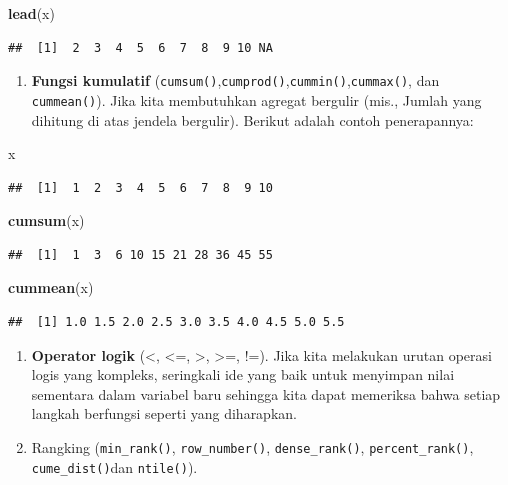 \documentclass[]{book}
\newenvironment{Shaded}{\begin{snugshade}}{\end{snugshade}}
\newcommand{\KeywordTok}[1]{\textcolor[rgb]{0.13,0.29,0.53}{\textbf{#1}}}
\newcommand{\NormalTok}[1]{#1}
\providecommand{\tightlist}{%
  \setlength{\itemsep}{0pt}\setlength{\parskip}{0pt}}
\begin{document}
\begin{Shaded}
\begin{Highlighting}[]
\KeywordTok{lead}\NormalTok{(x)}
\end{Highlighting}
\end{Shaded}

\begin{verbatim}
##  [1]  2  3  4  5  6  7  8  9 10 NA
\end{verbatim}

\begin{enumerate}
\def\labelenumi{\arabic{enumi}.}
\setcounter{enumi}{3}
\tightlist
\item
  \textbf{Fungsi kumulatif}
  (\texttt{cumsum()},\texttt{cumprod()},\texttt{cummin()},\texttt{cummax()},
  dan \texttt{cummean()}). Jika kita membutuhkan agregat bergulir (mis.,
  Jumlah yang dihitung di atas jendela bergulir). Berikut adalah contoh
  penerapannya:
\end{enumerate}

\begin{Shaded}
\begin{Highlighting}[]
\NormalTok{x}
\end{Highlighting}
\end{Shaded}

\begin{verbatim}
##  [1]  1  2  3  4  5  6  7  8  9 10
\end{verbatim}

\begin{Shaded}
\begin{Highlighting}[]
\KeywordTok{cumsum}\NormalTok{(x)}
\end{Highlighting}
\end{Shaded}

\begin{verbatim}
##  [1]  1  3  6 10 15 21 28 36 45 55
\end{verbatim}

\begin{Shaded}
\begin{Highlighting}[]
\KeywordTok{cummean}\NormalTok{(x)}
\end{Highlighting}
\end{Shaded}

\begin{verbatim}
##  [1] 1.0 1.5 2.0 2.5 3.0 3.5 4.0 4.5 5.0 5.5
\end{verbatim}

\begin{enumerate}
\def\labelenumi{\arabic{enumi}.}
\setcounter{enumi}{4}
\item
  \textbf{Operator logik} (\textless{}, \textless{}=, \textgreater{},
  \textgreater{}=, !=). Jika kita melakukan urutan operasi logis yang
  kompleks, seringkali ide yang baik untuk menyimpan nilai sementara
  dalam variabel baru sehingga kita dapat memeriksa bahwa setiap langkah
  berfungsi seperti yang diharapkan.
\item
  Rangking (\texttt{min\_rank()}, \texttt{row\_number()},
  \texttt{dense\_rank()}, \texttt{percent\_rank()},
  \texttt{cume\_dist()}dan \texttt{ntile()}).
\end{enumerate}
\end{document}
